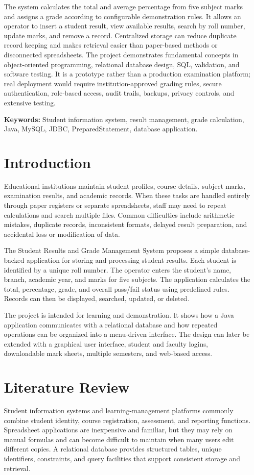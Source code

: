 \documentclass[11pt,a4paper]{report}
\begin{document}
The system calculates the total and average percentage from five subject marks and assigns a grade according to configurable demonstration rules. It allows an operator to insert a student result, view available results, search by roll number, update marks, and remove a record. Centralized storage can reduce duplicate record keeping and makes retrieval easier than paper-based methods or disconnected spreadsheets. The project demonstrates fundamental concepts in object-oriented programming, relational database design, SQL, validation, and software testing. It is a prototype rather than a production examination platform; real deployment would require institution-approved grading rules, secure authentication, role-based access, audit trails, backups, privacy controls, and extensive testing.

\textbf{Keywords:} Student information system, result management, grade calculation, Java, MySQL, JDBC, PreparedStatement, database application.

\section{Introduction}
Educational institutions maintain student profiles, course details, subject marks, examination results, and academic records. When these tasks are handled entirely through paper registers or separate spreadsheets, staff may need to repeat calculations and search multiple files. Common difficulties include arithmetic mistakes, duplicate records, inconsistent formats, delayed result preparation, and accidental loss or modification of data.

The Student Results and Grade Management System proposes a simple database-backed application for storing and processing student results. Each student is identified by a unique roll number. The operator enters the student's name, branch, academic year, and marks for five subjects. The application calculates the total, percentage, grade, and overall pass/fail status using predefined rules. Records can then be displayed, searched, updated, or deleted.

The project is intended for learning and demonstration. It shows how a Java application communicates with a relational database and how repeated operations can be organized into a menu-driven interface. The design can later be extended with a graphical user interface, student and faculty logins, downloadable mark sheets, multiple semesters, and web-based access.

\section{Literature Review}
Student information systems and learning-management platforms commonly combine student identity, course registration, assessment, and reporting functions. Spreadsheet applications are inexpensive and familiar, but they may rely on manual formulas and can become difficult to maintain when many users edit different copies. A relational database provides structured tables, unique identifiers, constraints, and query facilities that support consistent storage and retrieval.
\end{document}
